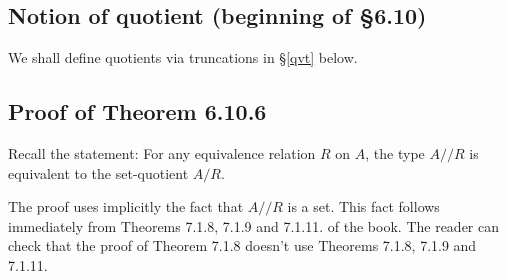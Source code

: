 \documentclass[12pt]{article}
\begin{document}
\subsection{Notion of quotient (beginning of \S6.10)}\label{610}

We shall define quotients via truncations in \S\ref{qvt} below.

\begin{comment}

To spell out the induction principle for the quotient $A/R$, let $\alpha(a,b):q(a)=q(b)$ be the path given from $q(a)$ to $q(b)$ whenever $R(a,b)$. 

Given $P:A/R\to\Set$ together with $f:\prod_{a:A}P(q(a))$ and 
$$
\beta(a,b):f(a)=^P_{\alpha(a,b)}f(b)
$$ 
for all $a,b$ such that $R(a,b)$, we have a $g:\prod_{x:A/R}P(x)$ such that $g(q(a))\equiv f(a)$ for all $a:A$, and $\apd_g(\alpha(a,b))=\beta(a,b)$ for all $a,b$ such that $R(a,b)$.

It is easy to see that if our type family $P:A/R\to\Set$ is such that $P(q(b))$ is a mere proposition whenever $R(a,b)$, and if we are just given an $f:\prod_{a:A}P(q(a))$, then we get a $g:\prod_{x:A/R}P(x)$ such that $g(q(a))\eq f(a)$ for all $a:A$.

\end{comment}




\subsection{Proof of Theorem 6.10.6}

Recall the statement: For any equivalence relation $R$ on $A$, the type $A/\!\!/R$ is equivalent to the set-quotient $A/R$.

The proof uses implicitly the fact that $A/\!\!/R$ is a set. This fact follows immediately from Theorems 7.1.8, 7.1.9 and 7.1.11. of the book. The reader can check that the proof of Theorem 7.1.8 doesn't use Theorems 7.1.8, 7.1.9 and 7.1.11.


\end{document}
